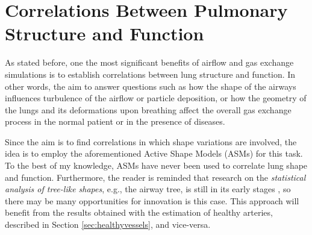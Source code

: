 \section{Correlations Between Pulmonary Structure and Function}

\challenge

As stated before, one the most significant benefits of airflow and gas exchange simulations is to establish correlations between lung structure and function. In other words, the aim to answer questions such as how the shape of the airways influences turbulence of the airflow or particle deposition, or how the geometry of the lungs and its deformations upon breathing affect the overall gas exchange process in the normal patient or in the presence of diseases. 

\approach

Since the aim is to find correlations in which shape variations are involved, the idea is to employ the aforementioned Active Shape Models (ASMs) \citep{Cootes} for this task. To the best of my knowledge, ASMs have never been used to correlate lung shape and function. Furthermore, the reader is reminded that research on the {\em statistical analysis of tree-like shapes}, e.g., the airway tree, is still in its early stages \citep{Feragen2011,Feragen2012}, so there may be many opportunities for innovation is this case. This approach will benefit from the results obtained with the estimation of healthy arteries, described in Section \ref{sec:healthyvessels}, and vice-versa.

